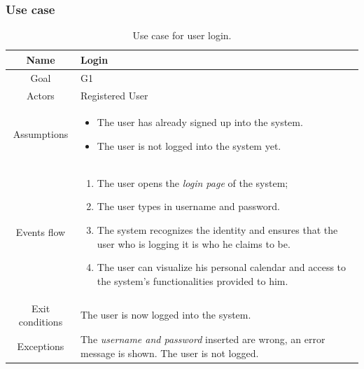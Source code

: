 \subsubsection{Use case}

\begin{table}[H]
\begin{center}
\begin{tabular}{|c||p{}|}
	\hline
    Name & Login \\ \hline
    Goal & G1 \\ \hline
    Actors & Registered User \\ \hline
    Assumptions & \begin{itemize}
    					\item The user has already signed up into the system. 
                        \item The user is not logged into the system yet.
                  \end{itemize} \\ \hline
    Events flow & \begin{enumerate}
                   		\item The user opens the \textit{login page} of the system;
                        \item The user types in username and password.
                        \item The system recognizes the identity and ensures that the user who is logging it is who he claims to be.
                        \item The user can visualize his personal calendar and access to the system's functionalities provided to him.
                     \end{enumerate} \\ \hline
   Exit conditions & The user is now logged into the system. \\ \hline
   Exceptions & The \textit{username and password} inserted are wrong, an error message is shown. The user is not logged.\\ \hline
\end{tabular}
\end{center}
\caption{Use case for user login.}
\label{usecase-login}
\end{table}

